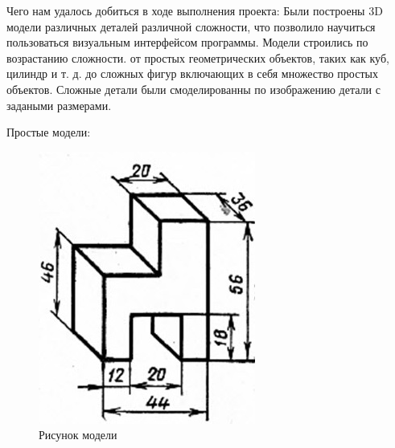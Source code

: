 \documentclass[a4paper,12pt]{article}
\theoremstyle{plain} %
\theoremstyle{definition} %
\theoremstyle{remark} %
\begin{document}
	Чего нам удалось добиться в ходе выполнения проекта:
	Были построены 3D модели различных деталей различной сложности, что позволило научиться пользоваться визуальным интерфейсом программы. Модели строились по возрастанию сложности. от простых геометрических объектов, таких как куб, цилиндр и т. д. до сложных фигур включающих в себя множество простых объектов. Сложные детали были смоделированны по изображению детали с задаными размерами. 

Простые модели:




	\begin{figure}[h]
		\begin{center}
			\begin{minipage}[h]{0.4\linewidth}
				\includegraphics[width=1\linewidth]{17.1}
				\caption{Рисунок модели} %
			\end{minipage}
			\hfill
			\begin{minipage}[h]{0.4\linewidth}

\end{minipage}
\end{center}
\end{figure}
\end{document}

